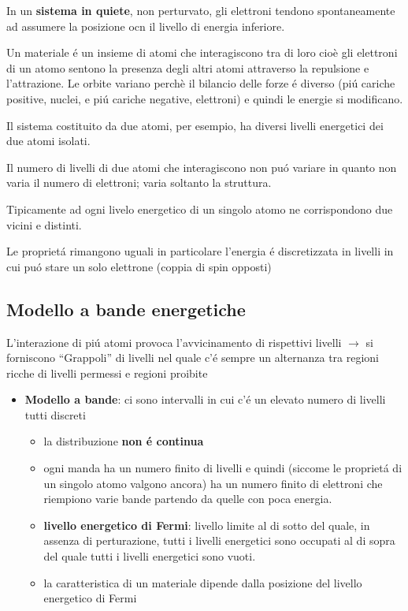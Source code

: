 \documentclass{article}
\begin{document}
In un \textbf{sistema in quiete}, non perturvato, gli elettroni tendono spontaneamente ad assumere la posizione ocn il livello di energia inferiore.

Un materiale \'e un insieme di atomi che interagiscono tra di loro cio\`e gli elettroni di un atomo sentono la presenza degli altri atomi attraverso la repulsione e l'attrazione. Le orbite variano perch\`e il bilancio delle forze \'e diverso (pi\'u cariche positive, nuclei, e pi\'u cariche negative, elettroni) e quindi le energie si modificano.

Il sistema costituito da due atomi, per esempio, ha diversi livelli energetici dei due atomi isolati.


Il numero di livelli di due atomi che interagiscono non pu\'o variare in quanto non varia il numero di elettroni; varia soltanto la struttura.

Tipicamente ad ogni livelo energetico di un singolo atomo ne corrispondono due vicini e distinti.

Le propriet\'a rimangono uguali in particolare l'energia \'e discretizzata in livelli in cui pu\'o stare un solo elettrone (coppia di spin opposti)

\subsection{Modello a bande energetiche}

L'interazione di pi\'u atomi provoca l'avvicinamento di rispettivi livelli $\rightarrow$ si forniscono ``Grappoli'' di livelli nel quale c'\'e sempre un alternanza tra regioni ricche di livelli permessi e regioni proibite

\begin{itemize}
    \item \textbf{Modello a bande}: ci sono intervalli in cui c'\'e un elevato numero di livelli tutti discreti
        \begin{itemize}
            \item la distribuzione \textbf{non \'e continua}
            \item ogni manda ha un numero finito di livelli e quindi (siccome le propriet\'a di un singolo atomo valgono ancora) ha un numero finito di elettroni che riempiono varie bande partendo da quelle con poca energia.
            \item \textbf{livello energetico di Fermi}: livello limite al di sotto del quale, in assenza di perturazione, tutti i livelli energetici sono occupati al di sopra del quale tutti i livelli energetici sono vuoti.
            \item la caratteristica di un materiale dipende dalla posizione del livello energetico di Fermi
        \end{itemize}
\end{itemize}
\end{document}
